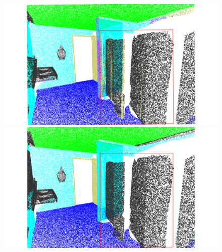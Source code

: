 \begin{figure}[htbp]
\begin{minipage}{0.17\textwidth}
    \end{minipage}
    \hfill
    \begin{minipage}{0.17\textwidth}
        \centering
        \includegraphics[width=\textwidth]{fig/supplement/semantic_segmentation/wc_2/PLT_wc_2.pdf}
    \end{minipage}
    \hfill
    \begin{minipage}{0.17\textwidth}
        \centering
        \includegraphics[width=\textwidth]{fig/supplement/semantic_segmentation/wc_2/GT_wc_2.pdf}
    \end{minipage}
    \hfill
    

\end{figure}
